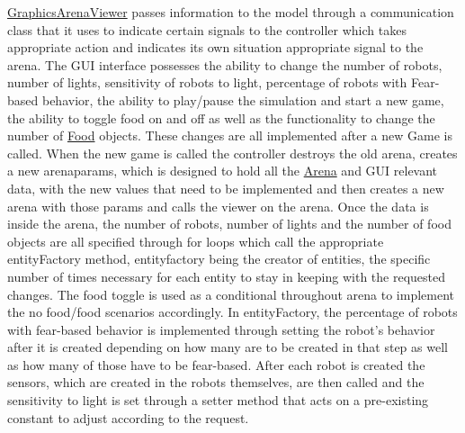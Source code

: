 \mbox{\hyperlink{class_graphics_arena_viewer}{Graphics\+Arena\+Viewer}} passes information to the model through a communication class that it uses to indicate certain signals to the controller which takes appropriate action and indicates its own situation appropriate signal to the arena. The G\+UI interface possesses the ability to change the number of robots, number of lights, sensitivity of robots to light, percentage of robots with Fear-\/based behavior, the ability to play/pause the simulation and start a new game, the ability to toggle food on and off as well as the functionality to change the number of \mbox{\hyperlink{class_food}{Food}} objects. These changes are all implemented after a new Game is called. When the new game is called the controller destroys the old arena, creates a new arenaparams, which is designed to hold all the \mbox{\hyperlink{class_arena}{Arena}} and G\+UI relevant data, with the new values that need to be implemented and then creates a new arena with those params and calls the viewer on the arena. Once the data is inside the arena, the number of robots, number of lights and the number of food objects are all specified through for loops which call the appropriate entity\+Factory method, entityfactory being the creator of entities, the specific number of times necessary for each entity to stay in keeping with the requested changes. The food toggle is used as a conditional throughout arena to implement the no food/food scenarios accordingly. In entity\+Factory, the percentage of robots with fear-\/based behavior is implemented through setting the robot’s behavior after it is created depending on how many are to be created in that step as well as how many of those have to be fear-\/based. After each robot is created the sensors, which are created in the robots themselves, are then called and the sensitivity to light is set through a setter method that acts on a pre-\/existing constant to adjust according to the request.